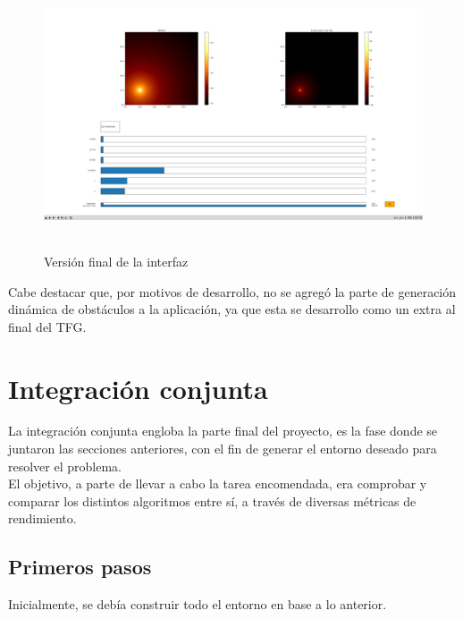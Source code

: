 \begin{figure} [H]
    \begin{center}
    \includegraphics[height=8cm]{imagenes/cap4/7_Friss_endGUI.png}
    \end{center}
	\caption[Versión final de la interfaz]{Versión final de la interfaz}
	\label{fig:friis_end_app}
\end{figure}

Cabe destacar que, por motivos de desarrollo, no se agregó la parte de generación dinámica de obstáculos a la aplicación, ya que esta se desarrollo como un extra al final del \ac{TFG}.\\

\newpage
\section{Integración conjunta}
\label{sec:integration}

La integración conjunta engloba la parte final del proyecto, es la fase donde se juntaron las secciones anteriores, con el fin de generar el entorno deseado para resolver el problema.\\

El objetivo, a parte de llevar a cabo la tarea encomendada, era comprobar y comparar los distintos algoritmos entre sí, a través de diversas métricas de rendimiento.\\

\subsection{Primeros pasos}
\label{subsec:primeros_pasos}

Inicialmente, se debía construir todo el entorno en base a lo anterior.\\

